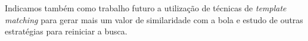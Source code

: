 \documentclass[11pt,a4paper]{article}
\begin{document}
 Indicamos também como trabalho futuro a utilização de técnicas de \textit{template matching} para gerar mais um valor de similaridade com a bola e estudo de outras estratégias para reiniciar a busca.

\begin{thebibliography}{99}







\end{thebibliography}
\end{document}
